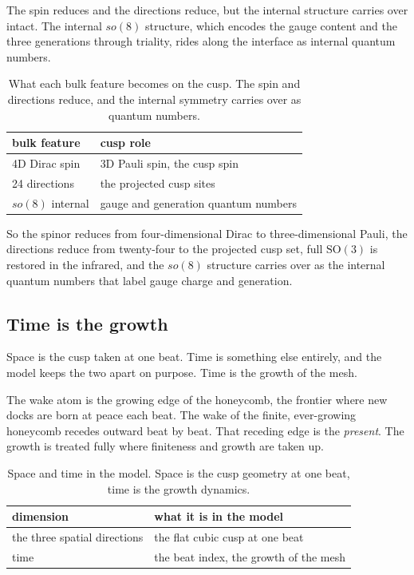 The spin reduces and the directions reduce, but the internal structure carries over intact. The internal $so(8)$ structure, which encodes the gauge content and the three generations through triality, rides along the interface as internal quantum numbers.

\begin{table}[ht]
\centering
\begin{tabular}{@{}ll@{}}
\toprule
bulk feature & cusp role \\
\midrule
4D Dirac spin & 3D Pauli spin, the cusp spin \\
24 directions & the projected cusp sites \\
$so(8)$ internal & gauge and generation quantum numbers \\
\bottomrule
\end{tabular}
\caption{What each bulk feature becomes on the cusp. The spin and directions reduce, and the internal symmetry carries over as quantum numbers.}
\label{tab:rides-along}
\end{table}

So the spinor reduces from four-dimensional Dirac to three-dimensional Pauli, the directions reduce from twenty-four to the projected cusp set, full $\mathrm{SO}(3)$ is restored in the infrared, and the $so(8)$ structure carries over as the internal quantum numbers that label gauge charge and generation.

\subsection{Time is the growth}

Space is the cusp taken at one beat. Time is something else entirely, and the model keeps the two apart on purpose. Time is the growth of the mesh.

The wake atom is the growing edge of the honeycomb, the frontier where new docks are born at peace each beat. The wake of the finite, ever-growing honeycomb recedes outward beat by beat. That receding edge is the \emph{present}. The growth is treated fully where finiteness and growth are taken up.

\begin{table}[ht]
\centering
\begin{tabular}{@{}ll@{}}
\toprule
dimension & what it is in the model \\
\midrule
the three spatial directions & the flat cubic cusp at one beat \\
time & the beat index, the growth of the mesh \\
\bottomrule
\end{tabular}
\caption{Space and time in the model. Space is the cusp geometry at one beat, time is the growth dynamics.}
\label{tab:space-and-time}
\end{table}

